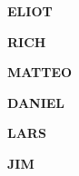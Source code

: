 


{\color{blue}
{\bf {\Large ELIOT}}
}

{\color{brown}
{\bf {\Large RICH}}
}

{\color{red}
{\bf {\Large MATTEO}}
}

{\color{purple}
{\bf {\Large DANIEL}}
}

{\color{green}
{\bf {\Large LARS}}
}

{\color{orange}
{\bf {\Large JIM}}
}




